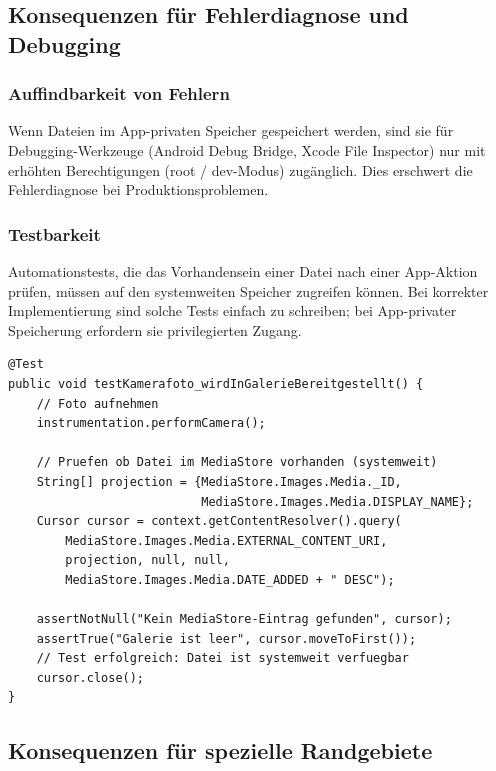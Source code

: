 ﻿\documentclass[12pt, a4paper]{article}
\begin{document}
\subsection{Konsequenzen für Fehlerdiagnose und Debugging}

\subsubsection{Auffindbarkeit von Fehlern}

Wenn Dateien im App-privaten Speicher gespeichert werden, sind sie für
Debugging-Werkzeuge (Android Debug Bridge, Xcode File Inspector) nur mit
erhöhten Berechtigungen (root / dev-Modus) zugänglich. Dies erschwert
die Fehlerdiagnose bei Produktionsproblemen.

\subsubsection{Testbarkeit}

Automationstests, die das Vorhandensein einer Datei nach einer App-Aktion
prüfen, müssen auf den systemweiten Speicher zugreifen können. Bei
korrekter Implementierung sind solche Tests einfach zu schreiben; bei
App-privater Speicherung erfordern sie privilegierten Zugang.

\begin{lstlisting}[style=android, caption={Automatisierter Test: Pruefung der systemweiten Bereitstellung}]
@Test
public void testKamerafoto_wirdInGalerieBereitgestellt() {
    // Foto aufnehmen
    instrumentation.performCamera();
    
    // Pruefen ob Datei im MediaStore vorhanden (systemweit)
    String[] projection = {MediaStore.Images.Media._ID,
                           MediaStore.Images.Media.DISPLAY_NAME};
    Cursor cursor = context.getContentResolver().query(
        MediaStore.Images.Media.EXTERNAL_CONTENT_URI,
        projection, null, null,
        MediaStore.Images.Media.DATE_ADDED + " DESC");
    
    assertNotNull("Kein MediaStore-Eintrag gefunden", cursor);
    assertTrue("Galerie ist leer", cursor.moveToFirst());
    // Test erfolgreich: Datei ist systemweit verfuegbar
    cursor.close();
}
\end{lstlisting}

\subsection{Konsequenzen für spezielle Randgebiete}
\end{document}

